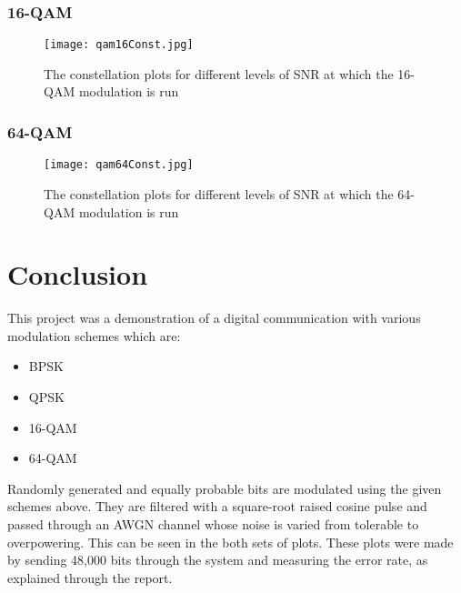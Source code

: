 \documentclass[]{article}
\begin{document}
\subsubsection{16-QAM}
\begin{figure}[H]
\centering
\hspace*{-2cm}\texttt{[image: qam16Const.jpg]}
\caption{The constellation plots for different levels of SNR at which the 16-QAM modulation is run}
\end{figure}
\subsubsection{64-QAM}
\begin{figure}[H]
\centering
\hspace*{-2cm}\texttt{[image: qam64Const.jpg]}
\caption{The constellation plots for different levels of SNR at which the 64-QAM modulation is run}
\end{figure}

\newpage

\section{Conclusion}
\label{sec:conc}
This project was a demonstration of a digital communication with various modulation schemes which are:
\begin{itemize}
\item BPSK
\item QPSK
\item 16-QAM
\item 64-QAM
\end{itemize}

Randomly generated and equally probable bits are modulated using the given schemes above.  They are filtered with a square-root raised cosine pulse and passed through an AWGN channel whose noise is varied from tolerable to overpowering.  This can be seen in the both sets of plots.  These plots were made by sending 48,000 bits through the system and measuring the error rate, as explained through the report.
\end{document}
